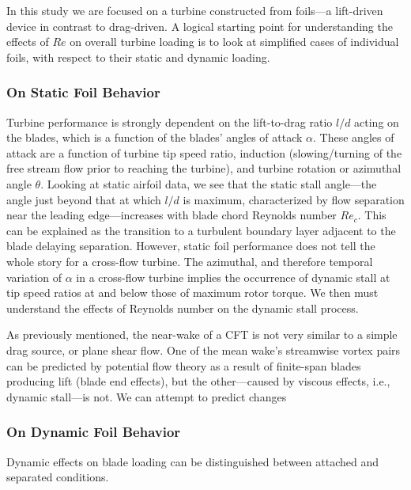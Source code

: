 \documentclass[energies,article,accept,moreauthors,pdftex,12pt,a4paper]{mdpi}
\begin{document}
In this study we are focused on a turbine constructed from foils---a lift-driven
device in contrast to drag-driven. A logical starting point for understanding
the effects of $Re$ on overall turbine loading is to look at simplified cases
of individual foils, with respect to their static and dynamic loading. 

\subsubsection{On Static Foil Behavior}

Turbine performance is strongly dependent on the lift-to-drag ratio $l/d$ acting
on the blades, which is a function of the blades' angles of attack $\alpha$.
These angles of attack are a function of turbine tip speed ratio, induction
(slowing/turning of the free stream flow prior to reaching the turbine), and
turbine rotation or azimuthal angle $\theta$. Looking at static airfoil data, we
see that the static stall angle---the angle just beyond that at which $l/d$ is
maximum, characterized by flow separation near the leading edge---increases with
blade chord Reynolds number $Re_c$. This can be explained as the transition to a
turbulent boundary layer adjacent to the blade delaying separation. However,
static foil performance does not tell the whole story for a cross-flow turbine.
The azimuthal, and therefore temporal variation of $\alpha$ in a cross-flow
turbine implies the occurrence of dynamic stall at tip speed ratios at and below
those of maximum rotor torque\cite{Para2002}. We then must understand the
effects of Reynolds number on the dynamic stall process.

As previously mentioned, the near-wake of a CFT is not very similar to a simple
drag source, or plane shear flow. One of the mean wake's streamwise vortex pairs
can be predicted by potential flow theory as a result of finite-span blades
producing lift (blade end effects), but the other---caused by viscous effects,
i.e., dynamic stall---is not. We can attempt to predict changes

\subsubsection{On Dynamic Foil Behavior}

Dynamic effects on blade loading can be distinguished between attached and
separated conditions. 
\end{document}
